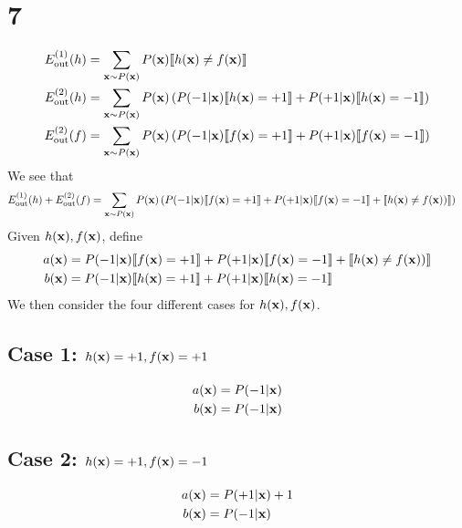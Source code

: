 \documentclass[11pt]{article}
\theoremstyle{definition}
\begin{document}
\section*{7}
\begin{align*}
  E^{(1)}_{\text{out}}(h) &= \sum_{\vb{x}\sim P(\vb{x})}P(\vb{x})\llbracket h(\vb{x}) \neq f(\vb{x})\rrbracket \\ 
  E^{(2)}_{\text{out}}(h) &= \sum_{\vb{x}\sim P(\vb{x})}P(\vb{x})\left(P(-1|\vb{x})\llbracket h(\vb{x}) = +1\rrbracket + P(+1|\vb{x})\llbracket h(\vb{x}) = -1\rrbracket\right) \\ 
  E^{(2)}_{\text{out}}(f) &= \sum_{\vb{x}\sim P(\vb{x})}P(\vb{x})\left(P(-1|\vb{x})\llbracket f(\vb{x}) = +1\rrbracket + P(+1|\vb{x})\llbracket f(\vb{x}) = -1\rrbracket\right) \\ 
\end{align*}
We see that 
\begin{align*}
  E^{(1)}_{\text{out}}(h) + E^{(2)}_{\text{out}}(f) &= \sum_{\vb{x}\sim P(\vb{x})}P(\vb{x})\left(P(-1|\vb{x})\llbracket f(\vb{x}) = +1\rrbracket + P(+1|\vb{x})\llbracket f(\vb{x}) = -1\rrbracket + \llbracket h(\vb{x}) \neq f(\vb{x})) \rrbracket\right)
\end{align*}
Given $h(\vb{x}), f(\vb{x})$, define 
\begin{align*}
  a(\vb{x}) &= P(-1|\vb{x})\llbracket f(\vb{x}) = +1\rrbracket + P(+1|\vb{x})\llbracket f(\vb{x}) = -1\rrbracket + \llbracket h(\vb{x}) \neq f(\vb{x})) \rrbracket \\
  b(\vb{x}) &= P(-1|\vb{x})\llbracket h(\vb{x}) = +1\rrbracket + P(+1|\vb{x})\llbracket h(\vb{x}) = -1\rrbracket
\end{align*} 
We then consider the four different cases for $h(\vb{x}), f(\vb{x})$. \\ 
\subsection*{Case 1: $h(\vb{x}) = +1, f(\vb{x})= +1$} 
\begin{align*}
  a(\vb{x}) &= P(-1|\vb{x}) \\ 
  b(\vb{x}) &= P(-1|\vb{x}) \\ 
\end{align*}
\subsection*{Case 2: $h(\vb{x}) = +1, f(\vb{x})= -1$} 
\begin{align*}
  a(\vb{x}) &= P(+1|\vb{x}) + 1 \\ 
  b(\vb{x}) &= P(-1|\vb{x}) \\
\end{align*}
\end{document}
